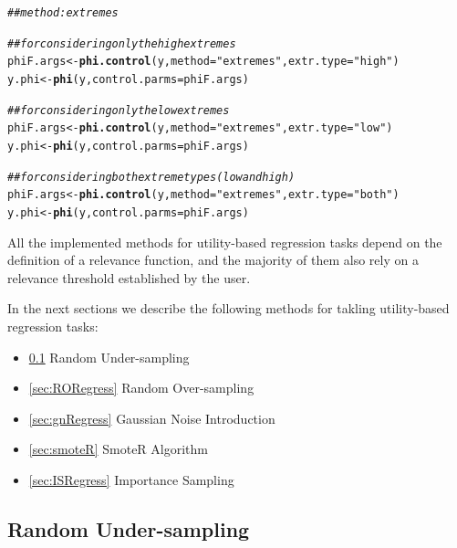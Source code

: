 \documentclass[10pt,a4paper]{article}\usepackage[]{graphicx}\usepackage[]{color}
\makeatletter
\newcommand{\hlstr}[1]{\textcolor[rgb]{0.192,0.494,0.8}{#1}}%
\newcommand{\hlcom}[1]{\textcolor[rgb]{0.678,0.584,0.686}{\textit{#1}}}%
\newcommand{\hlstd}[1]{\textcolor[rgb]{0.345,0.345,0.345}{#1}}%
\newcommand{\hlkwb}[1]{\textcolor[rgb]{0.69,0.353,0.396}{#1}}%
\newcommand{\hlkwc}[1]{\textcolor[rgb]{0.333,0.667,0.333}{#1}}%
\newcommand{\hlkwd}[1]{\textcolor[rgb]{0.737,0.353,0.396}{\textbf{#1}}}%
\newenvironment{kframe}{%
 \def\at@end@of@kframe{}%
 \ifinner\ifhmode%
  \def\at@end@of@kframe{\end{minipage}}%
  \begin{minipage}{\columnwidth}%
 \fi\fi%
 \def\FrameCommand##1{\hskip\@totalleftmargin \hskip-\fboxsep
 \colorbox{shadecolor}{##1}\hskip-\fboxsep
     \hskip-\linewidth \hskip-\@totalleftmargin \hskip\columnwidth}%
 \MakeFramed {\advance\hsize-\width
   \@totalleftmargin\z@ \linewidth\hsize
   \@setminipage}}%
 {\par\unskip\endMakeFramed%
 \at@end@of@kframe}
\newenvironment{knitrout}{}{} %
\makeatother
\begin{document}
\begin{knitrout}\footnotesize
{}\color{fgcolor}\begin{kframe}
\begin{alltt}
\hlcom{## method: extremes}

\hlcom{## for considering only the high extremes}
\hlstd{phiF.args} \hlkwb{<-} \hlkwd{phi.control}\hlstd{(y,}\hlkwc{method}\hlstd{=}\hlstr{"extremes"}\hlstd{,}\hlkwc{extr.type}\hlstd{=}\hlstr{"high"}\hlstd{)}
\hlstd{y.phi} \hlkwb{<-} \hlkwd{phi}\hlstd{(y,}\hlkwc{control.parms}\hlstd{=phiF.args)}

\hlcom{## for considering only the low extremes}
\hlstd{phiF.args} \hlkwb{<-} \hlkwd{phi.control}\hlstd{(y,}\hlkwc{method}\hlstd{=}\hlstr{"extremes"}\hlstd{,}\hlkwc{extr.type}\hlstd{=}\hlstr{"low"}\hlstd{)}
\hlstd{y.phi} \hlkwb{<-} \hlkwd{phi}\hlstd{(y,}\hlkwc{control.parms}\hlstd{=phiF.args)}

\hlcom{## for considering both extreme types (low and high)}
\hlstd{phiF.args} \hlkwb{<-} \hlkwd{phi.control}\hlstd{(y,}\hlkwc{method}\hlstd{=}\hlstr{"extremes"}\hlstd{,}\hlkwc{extr.type}\hlstd{=}\hlstr{"both"}\hlstd{)}
\hlstd{y.phi} \hlkwb{<-} \hlkwd{phi}\hlstd{(y,}\hlkwc{control.parms}\hlstd{=phiF.args)}
\end{alltt}
\end{kframe}
\end{knitrout}

All the implemented methods for utility-based regression tasks depend on the definition of a relevance function, and the majority of them also rely on a relevance threshold established by the user.

In the next sections we describe the following methods for takling utility-based regression tasks:
\begin{itemize}
\item \ref{sec:RURegress} Random Under-sampling
\item \ref{sec:RORegress} Random Over-sampling
\item \ref{sec:gnRegress} Gaussian Noise Introduction
\item \ref{sec:smoteR} SmoteR Algorithm
\item \ref{sec:ISRegress} Importance Sampling

\end{itemize}

\subsection{Random Under-sampling}\label{sec:RURegress}
\end{document}
